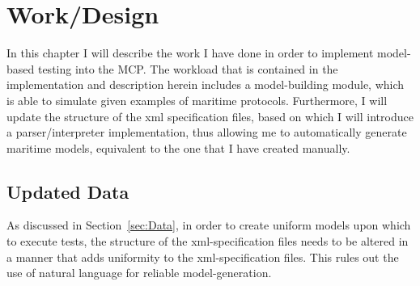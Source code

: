 \chapter{Work/Design}

In this chapter I will describe the work I have done in order to implement model-based testing into the MCP. The workload that is contained in the implementation and description herein includes a model-building module, which is able to simulate given examples of maritime protocols. Furthermore, I will update the structure of the xml specification files, based on which I will introduce a parser/interpreter implementation, thus allowing me to automatically generate maritime models, equivalent to the one that I have created manually.

\section{Updated Data}

As discussed in Section~\ref{sec:Data}, in order to create uniform models upon which to execute tests, the structure of the xml-specification files needs to be altered in a manner that adds uniformity to the xml-specification files. This rules out the use of natural language for reliable model-generation.

